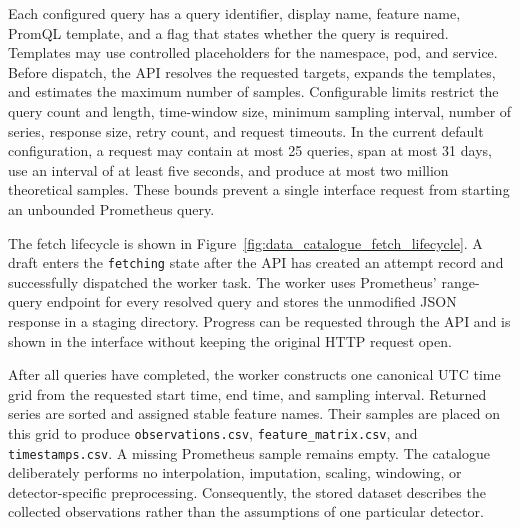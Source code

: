 Each configured query has a query identifier, display name, feature name, PromQL template, and a flag that states whether the query is required. Templates may use controlled placeholders for the namespace, pod, and service. Before dispatch, the API resolves the requested targets, expands the templates, and estimates the maximum number of samples. Configurable limits restrict the query count and length, time-window size, minimum sampling interval, number of series, response size, retry count, and request timeouts. In the current default configuration, a request may contain at most 25 queries, span at most 31 days, use an interval of at least five seconds, and produce at most two million theoretical samples. These bounds prevent a single interface request from starting an unbounded Prometheus query.

The fetch lifecycle is shown in Figure~\ref{fig:data_catalogue_fetch_lifecycle}. A draft enters the \texttt{fetching} state after the API has created an attempt record and successfully dispatched the worker task. The worker uses Prometheus' range-query endpoint for every resolved query and stores the unmodified JSON response in a staging directory. Progress can be requested through the API and is shown in the interface without keeping the original HTTP request open.

After all queries have completed, the worker constructs one canonical UTC time grid from the requested start time, end time, and sampling interval. Returned series are sorted and assigned stable feature names. Their samples are placed on this grid to produce \texttt{observations.csv}, \texttt{feature\_matrix.csv}, and \texttt{timestamps.csv}. A missing Prometheus sample remains empty. The catalogue deliberately performs no interpolation, imputation, scaling, windowing, or detector-specific preprocessing. Consequently, the stored dataset describes the collected observations rather than the assumptions of one particular detector.

